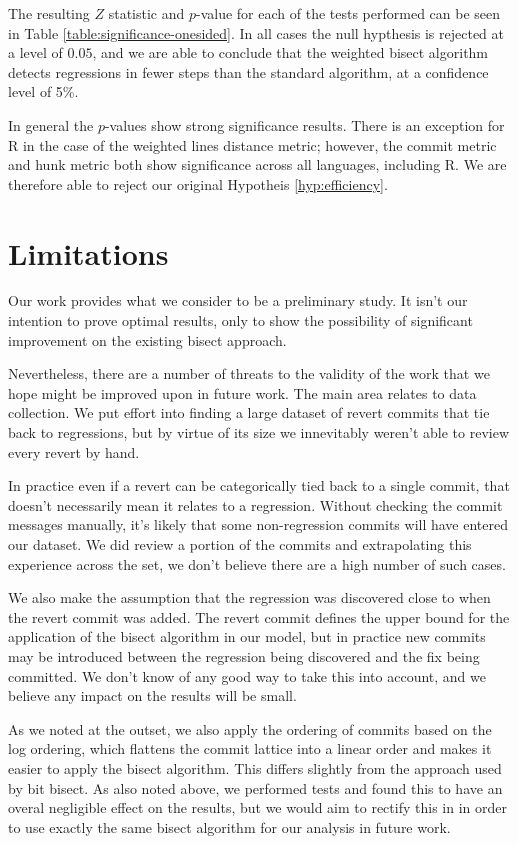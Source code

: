 \documentclass[10pt,journal,compsoc]{IEEEtran}
\begin{document}
The resulting $Z$ statistic and $p$-value for each of the tests performed can be seen in Table \ref{table:significance-onesided}. In all cases the null hypthesis is rejected at a level of $0.05$, and we are able to conclude that the weighted bisect algorithm detects regressions in fewer steps than the standard algorithm, at a confidence level of 5\%.

In general the $p$-values show strong significance results. There is an exception for R in the case of the weighted lines distance metric; however, the commit metric and hunk metric both show significance across all languages, including R. We are therefore able to reject our original Hypotheis \ref{hyp:efficiency}.

\section{Limitations}
\label{section:limitations}

Our work provides what we consider to be a preliminary study. It isn't our intention to prove optimal results, only to show the possibility of significant improvement on the existing bisect approach.

Nevertheless, there are a number of threats to the validity of the work that we hope might be improved upon in future work. The main area relates to data collection. We put effort into finding a large dataset of revert commits that tie back to regressions, but by virtue of its size we innevitably weren't able to review every revert by hand.

In practice even if a revert can be categorically tied back to a single commit, that doesn't necessarily mean it relates to a regression. Without checking the commit messages manually, it's likely that some non-regression commits will have entered our dataset. We did review a portion of the commits and extrapolating this experience across the set, we don't believe there are a high number of such cases.

We also make the assumption that the regression was discovered close to when the revert commit was added. The revert commit defines the upper bound for the application of the bisect algorithm in our model, but in practice new commits may be introduced between the regression being discovered and the fix being committed. We don't know of any good way to take this into account, and we believe any impact on the results will be small.

As we noted at the outset, we also apply the ordering of commits based on the log ordering, which flattens the commit lattice into a linear order and makes it easier to apply the bisect algorithm. This differs slightly from the approach used by {\code bit bisect}. As also noted above, we performed tests and found this to have an overal negligible effect on the results, but we would aim to rectify this in in order to use exactly the same bisect algorithm for our analysis in future work.
\end{document}
